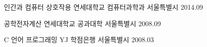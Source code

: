 


\begin{cvhonors}
  \cvhonor
    {인간과 컴퓨터 상호작용} %
    {연세대학교 컴퓨터과학과} %
    {서울특별시} %
    {2014.09} %

  \cvhonor
    {공학전자계산} %
    {연세대학교 공과대학} %
    {서울특별시} %
    {2008.09} %

  \cvhonor
    {C 언어 프로그래밍} %
    {YJ 학점은행} %
    {서울특별시} %
    {2008.03} %

\end{cvhonors}
